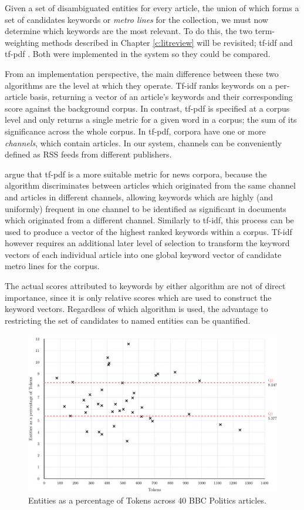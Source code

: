 Given a set of disambiguated entities for every article, the union of which forms a set of candidates keywords or \textit{metro lines} for the collection, we must now determine which keywords are the most relevant. To do this, the two term-weighting methods described in Chapter \ref{c:litreview} will be revisited; tf-idf \citep{tfidf} and tf-pdf \citep{TopicExtractionfromnewsArchiveUsingTFPDFAlgorithm}. Both were implemented in the system so they could be compared.

From an implementation perspective, the main difference between these two algorithms are the level at which they operate. Tf-idf ranks keywords on a per-article basis, returning a vector of an article's keywords and their corresponding score against the background corpus. In contrast, tf-pdf is specified at a corpus level and only returns a single metric for a given word in a corpus; the sum of its significance across the whole corpus. In tf-pdf, corpora have one or more \textit{channels}, which contain articles. In our system, channels can be conveniently defined as RSS feeds from different publishers. 

\citeauthor{TopicExtractionfromnewsArchiveUsingTFPDFAlgorithm} argue that tf-pdf is a more suitable metric for news corpora, because the algorithm discriminates between articles which originated from the same channel and articles in different channels, allowing keywords which are highly (and uniformly) frequent in one channel to be identified as significant in documents which originated from a different channel. Similarly to tf-idf, this process can be used to produce a vector of the highest ranked keywords within a corpus. Tf-idf however requires an additional later level of selection to transform the keyword vectors of each individual article into one global keyword vector of candidate metro lines for the corpus. 

The actual scores attributed to keywords by either algorithm are not of direct importance, since it is only relative scores which are used to construct the keyword vectors. Regardless of which algorithm is used, the advantage to restricting the set of candidates to named entities can be quantified. 
\begin{figure}[htbp!]
	\centering
	\includegraphics[width=\textwidth]{img/implementation/TokensEntities.pdf}
	\caption{Entities as a percentage of Tokens across 40 BBC Politics articles.}
	\label{fig:tokensentities}
\end{figure}

